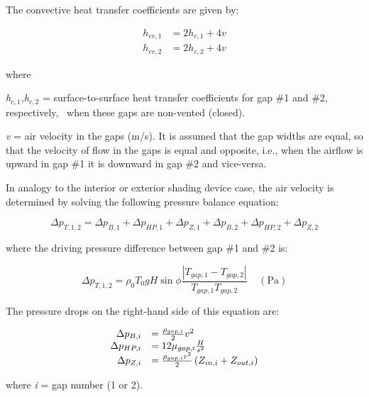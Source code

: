 The convective heat transfer coefficients are given by:

\begin{equation}
  \begin{array}{rl}
    h_{cv,1} &= 2 h_{c,1} + 4v \\
    h_{cv,2} &= 2 h_{c,2} + 4v
  \end{array}
\label{eq:hcv1hcv2Array}
\end{equation}

where

\emph{h\(_{c,1}\),h\(_{c,2}\)} = surface-to-surface heat transfer coefficients for gap \#1 and \#2,~ respectively,~ when these gaps are non-vented (closed).

\emph{v} = air velocity in the gaps (m/s). It is assumed that the gap widths are equal, so that the velocity of flow in the gaps is equal and opposite, i.e., when the airflow is upward in gap \#1 it is downward in gap \#2 and vice-versa.

In analogy to the interior or exterior shading device case, the air velocity is determined by solving the following pressure balance equation:

\begin{equation}
\Delta {p_{T,1,2}} = \Delta {p_{B,1}} + \Delta {p_{HP,1}} + \Delta {p_{Z,1}} + \Delta {p_{B,2}} + \Delta {p_{HP,2}} + \Delta {p_{Z,2}}
\end{equation}

where the driving pressure difference between gap \#1 and \#2 is:

\begin{equation}
\Delta {p_{T,1,2}} = {\rho_0}{T_0}gH\sin \phi \frac{{\left| {{T_{gap,1}} - {T_{gap,2}}} \right|}}{{{T_{gap,1}}{T_{gap,2}}}}{\mathrm{~~~~~(Pa)}}
\label{eq:DeltapT12Equation}
\end{equation}

The pressure drops on the right-hand side of this equation are:

\begin{equation}
  \begin{array}{rl}
    \Delta p_{B,i} &= \frac{\rho_{gap,i}}{2} v^2 \\
    \Delta p_{HP,i} &= 12 \mu_{gap,i} \frac{H}{s^2} \\
    \Delta p_{Z,i} &= \frac{\rho_{gap,i} v^2}{2}\left(Z_{in,i} + Z_{out,i}\right)
  \end{array}
\end{equation}

where \emph{i} = gap number (1 or 2).

